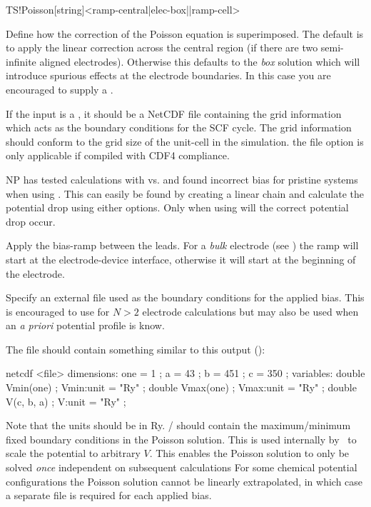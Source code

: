 \begin{fdfentry}{TS!Poisson}[string]<ramp-central|elec-box||ramp-cell>

  Define how the correction of the Poisson equation is
  superimposed. The default is to apply the linear correction across
  the central region (if there are two semi-infinite aligned
  electrodes).  Otherwise this defaults to the \emph{box} solution
  which will introduce spurious effects at the electrode
  boundaries. In this case you are encouraged to supply a .

  If the input is a , it should be a NetCDF file containing
  the grid information which acts as the boundary conditions for the
  SCF cycle. 
  The grid information should conform to the grid size of the
  unit-cell in the simulation.
  \note the file option is only applicable if compiled with CDF4
  compliance.

  \begin{developer}
    
    NP has tested calculations with 
    vs.  and found incorrect bias for pristine
    systems when using . This can easily be found by
    creating a linear chain and calculate the potential drop using
    either options. Only when using  will the correct
    potential drop occur.
    
  \end{developer}

  \begin{fdfoptions}

    Apply the bias-ramp between the leads. For a \emph{bulk} electrode
    (see ) the ramp will start at the
    electrode-device interface, otherwise it will start at the
    beginning of the electrode.


    \option[<file>]%

    Specify an external file used as the boundary conditions for the
    applied bias. This is encouraged to use for $N>2$ electrode
    calculations but may also be used when an \emph{a priori}
    potential profile is know.

    The file should contain something similar to this output
    ():
    \begin{shellexample}
netcdf <file> {
dimensions:
	one = 1 ;
	a = 43 ;
	b = 451 ;
	c = 350 ;
variables:
	double Vmin(one) ;
		Vmin:unit = "Ry" ;
	double Vmax(one) ;
		Vmax:unit = "Ry" ;
	double V(c, b, a) ;
		V:unit = "Ry" ;
}
    \end{shellexample}
    Note that the units should be in Ry. /
    should contain the maximum/minimum fixed boundary conditions in
    the Poisson solution. This is used internally by \tsiesta\ to
    scale the potential to arbitrary $V$. This enables the Poisson
    solution to only be solved \emph{once} independent on subsequent
    calculations For some chemical potential configurations the
    Poisson solution cannot be linearly extrapolated, in which case a
    separate file is required for each applied bias.


\end{fdfoptions}
\end{fdfentry}

